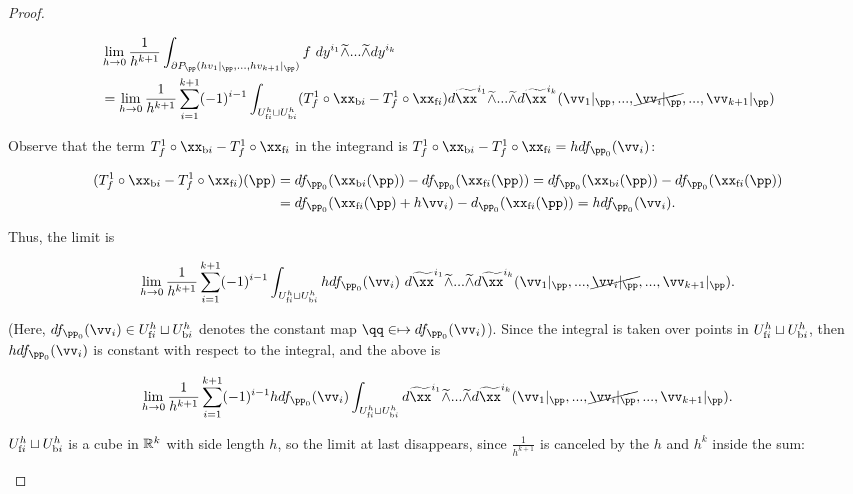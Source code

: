 \begin{proof}
\begin{enumerate}
        \begin{align*}
            &\lim_{h \rightarrow 0} \frac{1}{h^{k + 1}} \int_{\pd P_\pp(h v_1|_\pp, ..., hv_{k + 1}|_\pp)} f \spc dy^{i_1} \twedge ... \twedge dy^{i_k} \\
            &= \lim_{h \rightarrow 0} \frac{1}{h^{k + 1}} \sum_{i = 1}^{k + 1} (-1)^{i - 1} 
            \int_{\Ufi \sqcup \Ubi} (T^1_f \circ \xbi - T^1_f \circ \xfi) d\tx^{i_1} \twedge ... \twedge d\tx^{i_k}(\vv_1|_\pp, ..., \cancel{\vv_i|_\pp}, ..., \vv_{k + 1}|_\pp)
        \end{align*}
        
        Observe that the term $T^1_f \circ \xbi - T^1_f \circ \xfi$ in the integrand is $T^1_f \circ \xbi - T^1_f \circ \xfi = h df_{\pp_0}(\vv_i)$:
        
        \begin{align*}
            (T^1_f \circ \xbi - T^1_f \circ \xfi)(\pp) &= df_{\pp_0}(\xbi(\pp)) - df_{\pp_0}(\xfi(\pp))
            = df_{\pp_0}(\xbi(\pp)) - df_{\pp_0}(\xfi(\pp)) \\
            &= df_{\pp_0}(\xfi(\pp) + h\vv_i) - d_{\pp_0}(\xfi(\pp)) = h df_{\pp_0}(\vv_i).
        \end{align*}
        
        Thus, the limit is
        
         \begin{align*}
            \lim_{h \rightarrow 0} \frac{1}{h^{k + 1}} \sum_{i = 1}^{k + 1} (-1)^{i - 1}  \int_{\Ufi \sqcup \Ubi} h df_{\pp_0}(\vv_i) \spc d\tx^{i_1} \twedge ... \twedge d\tx^{i_k}(\vv_1|_\pp, ..., \cancel{\vv_i|_\pp}, ..., \vv_{k + 1}|_\pp).
        \end{align*}
        
        (Here, $df_{\pp_0}(\vv_i) \in \Ufi \sqcup \Ubi$ denotes the constant map $\qq \in \mapsto df_{\pp_0}(\vv_i)$). Since the integral is taken over points in $U_{\text{f}i}^h \sqcup U_{\text{b}i}^h$, then $h df_{\pp_0}(\vv_i)$ is constant with respect to the integral, and the above is
        
        \begin{align*}
            \lim_{h \rightarrow 0} \frac{1}{h^{k + 1}} \sum_{i = 1}^{k + 1} (-1)^{i - 1} h df_{\pp_0}(\vv_i) \int_{\Ufi \sqcup \Ubi} d\tx^{i_1} \twedge ... \twedge d\tx^{i_k}(\vv_1|_\pp, ..., \cancel{\vv_i|_\pp}, ..., \vv_{k + 1}|_\pp).
        \end{align*}
        
        $U_{\text{f}i}^h \sqcup U_{\text{b}i}^h$ is a cube in $\mathbb{R}^k$ with side length $h$, so the limit at last disappears, since $\frac{1}{h^{k + 1}}$ is canceled by the $h$ and $h^k$ inside the sum:


\end{enumerate}
\end{proof}
